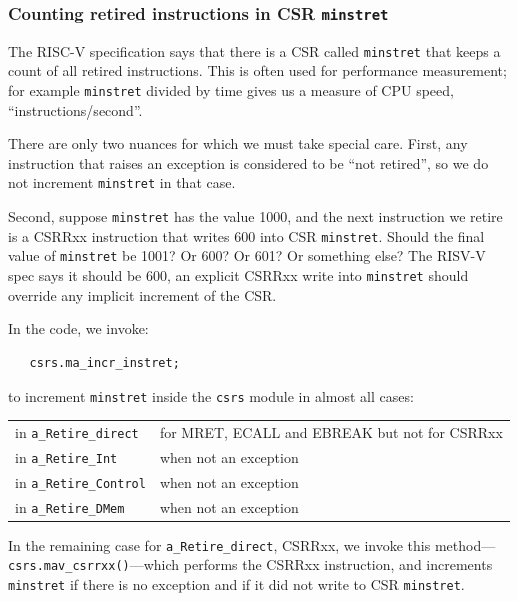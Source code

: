 
\subsubsection{Counting retired instructions in CSR {\tt minstret}}

The RISC-V specification says that there is a CSR called
\verb|minstret| that keeps a count of all retired instructions.  This
is often used for performance measurement; for example \verb|minstret|
divided by time gives us a measure of CPU speed,
``instructions/second''.

There are only two nuances for which we must take special care.
First, any instruction that raises an exception is considered to be
``not retired'', so we do not increment \verb|minstret| in that case.

Second, suppose \verb|minstret| has the value 1000, and the next
instruction we retire is a CSRRxx instruction that writes 600 into CSR
\verb|minstret|.  Should the final value of \verb|minstret| be 1001?
Or 600? Or 601? Or something else?  The RISV-V spec says it should be
600, {\ie} an explicit CSRRxx write into \verb|minstret| should
override any implicit increment of the CSR.

In the {\DRUM} code, we invoke:

{\footnotesize
\begin{Verbatim}
   csrs.ma_incr_instret;
\end{Verbatim}
}

to increment \verb|minstret| inside the \verb|csrs| module in almost
all cases:

\hmm
\begin{tabular}{ll}
 in {\tt a\_Retire\_direct}   & for MRET, ECALL and EBREAK but not for CSRRxx \\
 in {\tt a\_Retire\_Int}      & when not an exception \\
 in {\tt a\_Retire\_Control}  & when not an exception \\
 in {\tt a\_Retire\_DMem}     & when not an exception
\end{tabular}

In the remaining case for {\tt a\_Retire\_direct}, CSRRxx, we invoke
this method---{\tt csrs.mav\_csrrxx()}---which performs the CSRRxx
instruction, and increments \verb|minstret| if there is no exception
and if it did not write to CSR \verb|minstret|.


